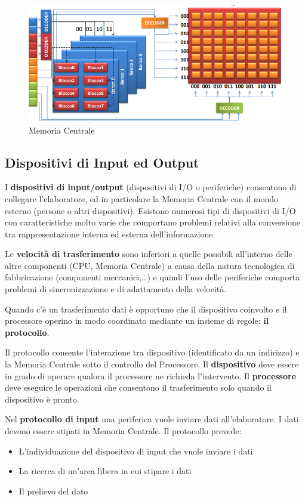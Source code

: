 \documentclass[12pt]{article} %
\begin{document}
\begin{figure}[h]
    \centering
    \includegraphics[width=0.75\linewidth]{Memoria Centrale.png}
    \caption{Memoria Centrale} 
\end{figure}
\newpage
\subsection{Dispositivi di Input ed Output}
I \textbf{dispositivi di input/output} (dispositivi di I/O o periferiche) consentono di collegare l’elaboratore, ed in particolare la Memoria Centrale con il mondo esterno (persone o altri dispositivi). Esistono numerosi tipi di dispositivi di I/O con caratteristiche molto varie che comportano problemi relativi alla conversione tra rappresentazione interna ed esterna dell’informazione.\par\medskip\noindent
Le \textbf{velocità di trasferimento} sono inferiori a quelle possibili all’interno delle altre componenti (CPU, Memoria Centrale) a causa della natura tecnologica di fabbricazione (componenti meccanici,…) e quindi l’uso delle periferiche comporta problemi di sincronizzazione e di adattamento della velocità.\par\medskip\noindent
Quando c’è un trasferimento dati è opportuno che il dispositivo coinvolto e il processore operino in modo coordinato mediante un insieme di regole: \textbf{il protocollo}.\par\medskip\noindent
Il protocollo consente l’interazione tra dispositivo (identificato da un indirizzo) e la Memoria Centrale sotto il controllo del Processore. Il \textbf{dispositivo} deve essere in grado di operare qualora il processore ne richieda l’intervento. Il \textbf{processore} deve eseguire le operazioni che consentono il trasferimento solo quando il dispositivo è pronto.\par\medskip\noindent
Nel\textbf{ protocollo di input} una periferica vuole inviare dati all’elaboratore. I dati devono essere stipati in Memoria Centrale.
Il protocollo prevede:
\begin{itemize}
    \item  L’individuazione del dispositivo di input che vuole inviare i dati
    \item  La ricerca di un’area libera in cui stipare i dati
    \item  Il prelievo del dato 
\end{itemize}
\end{document}
